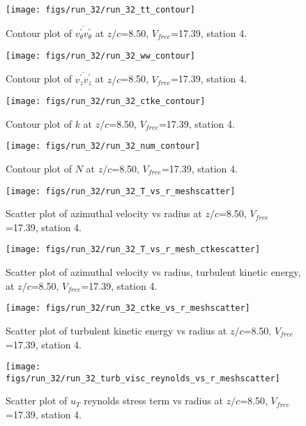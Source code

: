 \begin{figure}[H]
\centering
\texttt{[image: figs/run\_32/run\_32\_tt\_contour]}
\caption{Contour plot of $\overline{v_{\theta}^{\prime} v_{\theta}^{\prime}}$ at $z/c$=8.50, $V_{free}$=17.39, station 4.}
\end{figure}


\begin{figure}[H]
\centering
\texttt{[image: figs/run\_32/run\_32\_ww\_contour]}
\caption{Contour plot of $\overline{v_{z}^{\prime} v_{z}^{\prime}}$ at $z/c$=8.50, $V_{free}$=17.39, station 4.}
\end{figure}


\begin{figure}[H]
\centering
\texttt{[image: figs/run\_32/run\_32\_ctke\_contour]}
\caption{Contour plot of $k$ at $z/c$=8.50, $V_{free}$=17.39, station 4.}
\end{figure}


\begin{figure}[H]
\centering
\texttt{[image: figs/run\_32/run\_32\_num\_contour]}
\caption{Contour plot of $N$ at $z/c$=8.50, $V_{free}$=17.39, station 4.}
\end{figure}


\begin{figure}[H]
\centering
\texttt{[image: figs/run\_32/run\_32\_T\_vs\_r\_meshscatter]}
\caption{Scatter plot of azimuthal velocity vs radius at $z/c$=8.50, $V_{free}$=17.39, station 4.}
\end{figure}


\begin{figure}[H]
\centering
\texttt{[image: figs/run\_32/run\_32\_T\_vs\_r\_mesh\_ctkescatter]}
\caption{Scatter plot of azimuthal velocity vs radius, turbulent kinetic energy, at $z/c$=8.50, $V_{free}$=17.39, station 4.}
\end{figure}


\begin{figure}[H]
\centering
\texttt{[image: figs/run\_32/run\_32\_ctke\_vs\_r\_meshscatter]}
\caption{Scatter plot of turbulent kinetic energy vs radius at $z/c$=8.50, $V_{free}$=17.39, station 4.}
\end{figure}


\begin{figure}[H]
\centering
\texttt{[image: figs/run\_32/run\_32\_turb\_visc\_reynolds\_vs\_r\_meshscatter]}
\caption{Scatter plot of $
u_T$ reynolds stress term vs radius at $z/c$=8.50, $V_{free}$=17.39, station 4.}
\end{figure}


